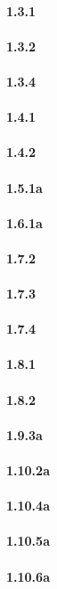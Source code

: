 \documentclass{article}
\begin{document}
\paragraph{1.3.1}
\paragraph{1.3.2}
\paragraph{1.3.4}
\paragraph{1.4.1}
\paragraph{1.4.2}
\paragraph{1.5.1a}
\paragraph{1.6.1a}
\paragraph{1.7.2}
\paragraph{1.7.3}
\paragraph{1.7.4}
\paragraph{1.8.1}
\paragraph{1.8.2}
\paragraph{1.9.3a}
\paragraph{1.10.2a}
\paragraph{1.10.4a}
\paragraph{1.10.5a}
\paragraph{1.10.6a}
\end{document}
